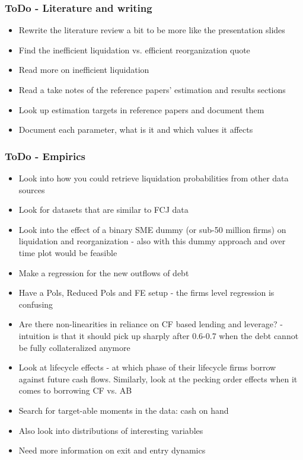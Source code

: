 \documentclass[12pt]{article}
\begin{document}
\newpage

\subsubsection*{ToDo - Literature and writing}
\begin{itemize}\setlength\itemsep{0em} \small
    \item Rewrite the literature review a bit to be more like the presentation slides
    \item Find the inefficient liquidation vs. efficient reorganization quote \checkmark 
    \item Read more on inefficient liquidation \checkmark
    \item Read a take notes of the reference papers' estimation and results sections \checkmark
    \item Look up estimation targets in reference papers and document them \checkmark
    \item Document each parameter, what is it and which values it affects \checkmark

\end{itemize} \normalsize

\subsubsection*{ToDo - Empirics}
\begin{itemize}\setlength\itemsep{0em} \small
    \item Look into how you could retrieve liquidation probabilities from other data sources \checkmark
    \item Look for datasets that are similar to FCJ data
    \item Look into the effect of a binary SME dummy (or sub-50 million firms) on liquidation and reorganization - also with this dummy approach and over time plot would be feasible \checkmark
    \item Make a regression for the new outflows of debt
    \item Have a Pols, Reduced Pols and FE  setup - the firms level regression is confusing
    \item Are there non-linearities in reliance on CF based lending and leverage? - intuition is that it should pick up sharply after 0.6-0.7 when the debt cannot be fully collateralized anymore
    \item Look at lifecycle effects - at which phase of their lifecycle firms borrow against future cash flows. Similarly, look at the pecking order effects when it comes to borrowing CF vs. AB
    \item Search for target-able moments in the data: cash on hand
    \item Also look into distributions of interesting variables
    \item Need more information on exit and entry dynamics
\end{itemize} \normalsize
\end{document}

